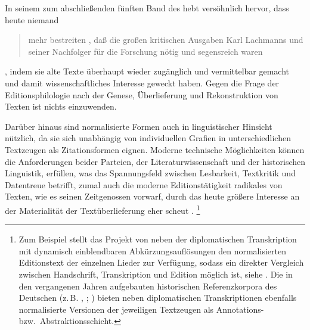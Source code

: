In seinem  zum abschließenden fünften Band des
\CAO{} hebt \citeauthor{deboor1976} versöhnlich hervor, dass heute
niemand \blockcquote[\RN{13}]{deboor1976}{mehr bestreiten , daß
die großen kritischen Ausgaben Karl Lachmanns und seiner Nachfolger für die
Forschung nötig und segensreich waren}, indem sie alte Texte überhaupt wieder
zugänglich und vermittelbar gemacht und damit wissenschaftliches Interesse
geweckt haben. Gegen die Frage der Editionsphilologie nach der Genese,
Überlieferung und Rekonstruktion von Texten ist nichts einzuwenden.

Darüber hinaus sind normalisierte Formen auch in linguistischer Hinsicht
nützlich, da sie sich unabhängig von individuellen Grafien in
unterschiedlichen Textzeugen als Zitations\-formen eignen. Moderne technische
Möglich\-keiten können die Anforderungen beider Parteien, der
Literaturwissenschaft und der historischen Linguistik, erfüllen, was das
Spannungsfeld zwischen Lesbarkeit, Textkritik und Datentreue betrifft, zumal
auch die moderne Editionstätigkeit radikales  von Texten, wie
\citeauthor{wilhelm1932} es seinen Zeitgenossen vorwarf, durch das heute
größere Interesse an der Materialität der Textüberlieferung eher scheut
\autocite[vgl.][1306]{wegera2000}.%
%
	\footnote{Zum Beispiel stellt das Projekt  von
	\citet{ldmdigital} neben der diplomatischen Transkription mit dynamisch
	einblendbaren Abkürzungsauflösungen den normalisierten Editionstext der
	einzelnen Lieder zur Verfügung, sodass ein direkter Vergleich zwischen
	Handschrift, Transkription und Edition möglich ist, siehe
	. Die in den vergangenen Jahren aufgebauten
	historischen Referenzkorpora des Deutschen
	(z.\,B. \cite{ddd}, \cite{rem}; \cite[vgl.][522--523]{dipper2015}) bieten neben
	diplomatischen Transkriptionen ebenfalls normalisierte Versionen der
	jeweiligen Textzeugen als Annotations- bzw.\ Abstraktionsschicht.}

